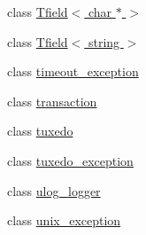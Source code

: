 \begin{DoxyCompactItemize}
\item 
class \hyperlink{classatmi_1_1_tfield_3_01char_01_5_01_4}{Tfield$<$ char $\ast$ $>$}
\item 
class \hyperlink{classatmi_1_1_tfield_3_01string_01_4}{Tfield$<$ string $>$}
\item 
class \hyperlink{classatmi_1_1timeout__exception}{timeout\+\_\+exception}
\item 
class \hyperlink{classatmi_1_1transaction}{transaction}
\item 
class \hyperlink{classatmi_1_1tuxedo}{tuxedo}
\item 
class \hyperlink{classatmi_1_1tuxedo__exception}{tuxedo\+\_\+exception}
\item 
class \hyperlink{classatmi_1_1ulog__logger}{ulog\+\_\+logger}
\item 
class \hyperlink{classatmi_1_1unix__exception}{unix\+\_\+exception}
\end{DoxyCompactItemize}
